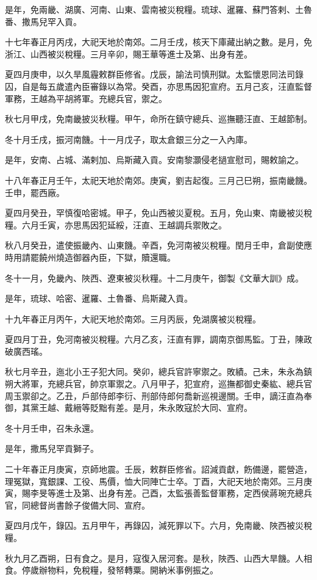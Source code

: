 \begin{pinyinscope}
是年，免兩畿、湖廣、河南、山東、雲南被災稅糧。琉球、暹羅、蘇門答剌、土魯番、撒馬兒罕入貢。

十七年春正月丙戌，大祀天地於南郊。二月壬戌，核天下庫藏出納之數。是月，免浙江、山西被災稅糧。三月辛卯，賜王華等進士及第、出身有差。

夏四月庚申，以久旱風霾敕群臣修省。戊辰，諭法司慎刑獄。太監懷恩同法司錄囚，自是每五歲遣內臣審錄以為常。癸酉，亦思馬因犯宣府。五月己亥，汪直監督軍務，王越為平胡將軍。充總兵官，禦之。

秋七月甲戌，免南畿披災秋糧。甲午，命所在鎮守總兵、巡撫聽汪直、王越節制。

冬十月壬戌，振河南饑。十一月戊子，取太倉銀三分之一入內庫。

是年，安南、占城、滿剌加、烏斯藏入貢。安南黎灝侵老撾宣慰司，賜敕諭之。

十八年春正月壬午，太祀天地於南郊。庚寅，劉吉起復。三月己巳朔，振南畿饑。壬申，罷西廠。

夏四月癸丑，罕慎復哈密城。甲子，免山西被災夏稅。五月，免山東、南畿被災稅糧。六月壬寅，亦思馬因犯延綏，汪直、王越調兵禦敗之。

秋八月癸丑，遣使振畿內、山東饑。辛酉，免河南被災稅糧。閏月壬申，倉副使應時用請罷饒州燒造御器內臣，下獄，贖還職。

冬十一月，免畿內、陜西、遼東被災秋糧。十二月庚午，御製《文華大訓》成。

是年，琉球、哈密、暹羅、土魯番、烏斯藏入貢。

十九年春正月丙午，大祀天地於南郊。三月丙辰，免湖廣被災稅糧。

夏四月丁丑，免河南被災稅糧。六月乙亥，汪直有罪，調南京御馬監。丁丑，陳政破廣西瑤。

秋七月辛丑，迤北小王子犯大同。癸卯，總兵官許寧禦之。敗績。己未，朱永為鎮朔大將軍，充總兵官，帥京軍禦之。八月甲子，犯宣府，巡撫都御史秦紘、總兵官周玉禦卻之。乙丑，戶部侍郎李衍、刑部侍郎何喬新巡視邊關。壬申，謫汪直為奉御，其黨王越、戴縉等貶黜有差。是月，朱永敗寇於大同、宣府。

冬十月壬申，召朱永還。

是年，撒馬兒罕貢獅子。

二十年春正月庚寅，京師地震。壬辰，敕群臣修省。詔減貢獻，飭備邊，罷營造，理冤獄，寬銀課、工役、馬價，恤大同陣亡士卒。丁酉，大祀天地於南郊。三月庚寅，賜李旻等進士及第、出身有差。己酉，太監張善監督軍務，定西侯蔣琬充總兵官，同總督尚書餘子俊備大同、宣府。

夏四月戊午，錄囚。五月甲午，再錄囚，減死罪以下。六月，免南畿、陜西被災稅糧。

秋九月乙酉朔，日有食之。是月，寇復入居河套。是秋，陜西、山西大旱饑。人相食。停歲辦物料，免稅糧，發帑轉粟。開納米事例振之。


\end{pinyinscope}
